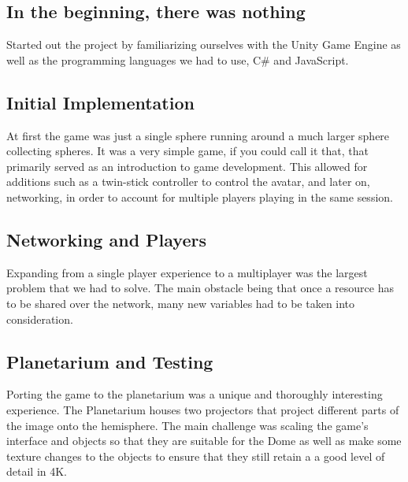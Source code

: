 \documentclass[11pt,a4paper]{article}
\begin{document}
        \subsection{ In the beginning, there was nothing }
        Started out the project by familiarizing ourselves with the Unity Game Engine  as well as the programming languages we had to use, C\# and JavaScript.

        \subsection{Initial Implementation}
        At first the game was just a single sphere running around a much larger sphere collecting spheres. It was a very simple game, if you could call it that, that primarily served as an introduction to game development. This allowed for additions such as a twin-stick controller to control the avatar, and later on, networking, in order to account for multiple players playing in the same session.

        \subsection{Networking and Players}
        Expanding from a single player experience to a multiplayer was the largest problem that we had to solve. The main obstacle being that once a resource has to be shared over the network, many new variables had to be taken into consideration.

        \subsection{Planetarium and Testing}
        Porting the game to the planetarium was a unique and thoroughly interesting experience. The Planetarium houses two projectors that project different parts of the image onto the hemisphere. The main challenge was scaling the game's interface and objects so that they are suitable for the Dome as well as make some texture changes to the objects to ensure that they still retain a a good level of detail in 4K.
\end{document}

